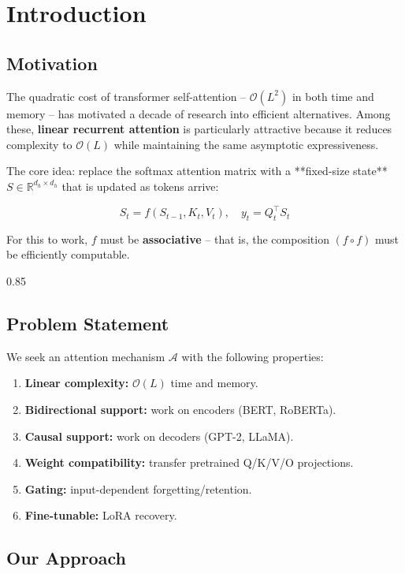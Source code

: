
\section{Introduction}

\subsection{Motivation}

The quadratic cost of transformer self-attention -- $\mathcal{O}(L^2)$ in 
both time and memory -- has motivated a decade of research into efficient 
alternatives. Among these, \textbf{linear recurrent attention} is particularly 
attractive because it reduces complexity to $\mathcal{O}(L)$ while 
maintaining the same asymptotic expressiveness.

The core idea: replace the softmax attention matrix with a **fixed-size 
state** $S \in \mathbb{R}^{d_h \times d_h}$ that is updated as tokens arrive:

\[
S_t = f(S_{t-1}, K_t, V_t), \quad y_t = Q_t^\top S_t
\tag{1.1}
\]

For this to work, $f$ must be \textbf{associative} -- that is, the composition 
$(f \circ f)$ must be efficiently computable.

0.85


\subsection{Problem Statement}

We seek an attention mechanism $\mathcal{A}$ with the following properties:

\begin{enumerate}
\item \textbf{Linear complexity:} $\mathcal{O}(L)$ time and memory.
\item \textbf{Bidirectional support:} work on encoders (BERT, RoBERTa).
\item \textbf{Causal support:} work on decoders (GPT-2, LLaMA).
\item \textbf{Weight compatibility:} transfer pretrained Q/K/V/O projections.
\item \textbf{Gating:} input-dependent forgetting/retention.
\item \textbf{Fine-tunable:} LoRA recovery.

\end{enumerate}
\subsection{Our Approach}

